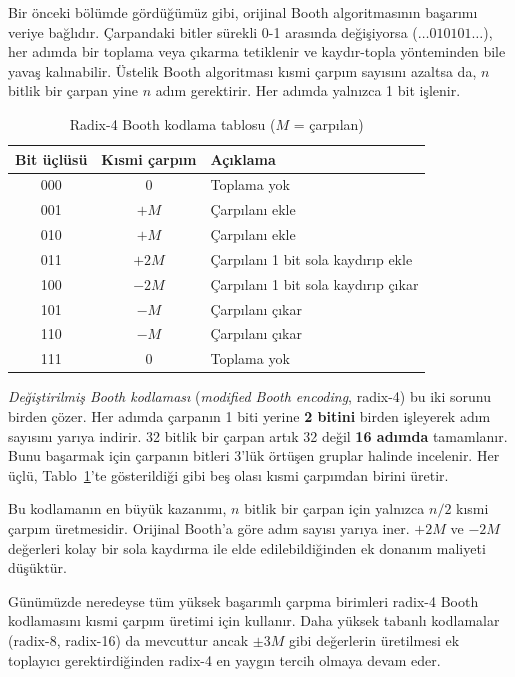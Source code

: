 Bir önceki bölümde gördüğümüz gibi, orijinal Booth algoritmasının başarımı veriye bağlıdır. Çarpandaki bitler sürekli 0-1 arasında değişiyorsa ($\ldots 010101 \ldots$), her adımda bir toplama veya çıkarma tetiklenir ve kaydır-topla yönteminden bile yavaş kalınabilir. Üstelik Booth algoritması kısmi çarpım sayısını azaltsa da, $n$ bitlik bir çarpan yine $n$ adım gerektirir. Her adımda yalnızca 1 bit işlenir.

\begin{table}[htbp]
\centering
\caption{Radix-4 Booth kodlama tablosu ($M$ = çarpılan)}
\label{tab:radix4-booth}
\begin{tabular}{c c l}
\toprule
\textbf{Bit üçlüsü} & \textbf{Kısmi çarpım} & \textbf{Açıklama} \\
\midrule
000 & $0$ & Toplama yok \\
001 & $+M$ & Çarpılanı ekle \\
010 & $+M$ & Çarpılanı ekle \\
011 & $+2M$ & Çarpılanı 1 bit sola kaydırıp ekle \\
100 & $-2M$ & Çarpılanı 1 bit sola kaydırıp çıkar \\
101 & $-M$ & Çarpılanı çıkar \\
110 & $-M$ & Çarpılanı çıkar \\
111 & $0$ & Toplama yok \\
\bottomrule
\end{tabular}
\end{table}

\emph{Değiştirilmiş Booth kodlaması} (\emph{modified Booth encoding}, radix-4) bu iki sorunu birden çözer. Her adımda çarpanın 1 biti yerine \textbf{2 bitini} birden işleyerek adım sayısını yarıya indirir. 32 bitlik bir çarpan artık 32 değil \textbf{16 adımda} tamamlanır. Bunu başarmak için çarpanın bitleri 3'lük örtüşen gruplar halinde incelenir. Her üçlü, Tablo~\ref{tab:radix4-booth}'te gösterildiği gibi beş olası kısmi çarpımdan birini üretir.

Bu kodlamanın en büyük kazanımı, $n$ bitlik bir çarpan için yalnızca $n/2$ kısmi çarpım üretmesidir. Orijinal Booth'a göre adım sayısı yarıya iner. $+2M$ ve $-2M$ değerleri kolay bir sola kaydırma ile elde edilebildiğinden ek donanım maliyeti düşüktür.

Günümüzde neredeyse tüm yüksek başarımlı çarpma birimleri radix-4 Booth kodlamasını kısmi çarpım üretimi için kullanır. Daha yüksek tabanlı kodlamalar (radix-8, radix-16) da mevcuttur ancak $\pm 3M$ gibi değerlerin üretilmesi ek toplayıcı gerektirdiğinden radix-4 en yaygın tercih olmaya devam eder.

